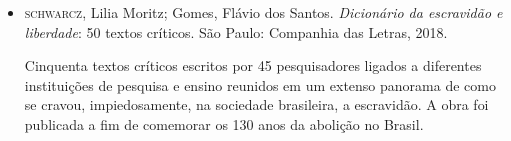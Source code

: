 \documentclass[12pt]{extarticle}
\begin{document}
\begin{itemize}
\item\textsc{schwarcz}, Lilia Moritz; Gomes, Flávio dos Santos. \emph{Dicionário da
escravidão e liberdade}: 50 textos críticos. São Paulo: Companhia das
Letras, 2018. 

Cinquenta textos críticos escritos por 45 pesquisadores ligados a
diferentes instituições de pesquisa e ensino reunidos em um extenso
panorama de como se cravou, impiedosamente, na sociedade brasileira, a
escravidão. A obra foi publicada a fim de comemorar os 130 anos da
abolição no Brasil.

\end{itemize}
\end{document}
